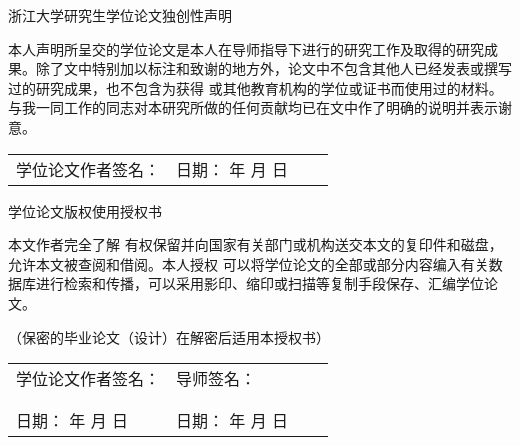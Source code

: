 {
  \vspace*{0.6em}%
  {
    \centering
    \xiaoer
    浙江大学研究生学位论文独创性声明 \par
  }

  \vspace{3.1em}
  {
    \setlength{\parindent}{2em}
    \linespread{1.6}
    \xiaosi
    本人声明所呈交的学位论文是本人在导师指导下进行的研究工作及取得的研究成果。除了文中特别加以标注和致谢的地方外，论文中不包含其他人已经发表或撰写过的研究成果，也不包含为获得 \underline{\kaiti\sihao\bfseries {}} 或其他教育机构的学位或证书而使用过的材料。与我一同工作的同志对本研究所做的任何贡献均已在文中作了明确的说明并表示谢意。 \par
  }

  \vspace{2.9em}
  {
    \xiaosi
    \begin{tabular}{@{} p{0.5\linewidth} p{0.5\linewidth} @{}}
    学位论文作者签名： & 日期： \hspace{4em} 年 \hspace{2em} 月 \hspace{2em} 日 \\
    \end{tabular} \par
  }

  \vspace{4.85em}
  {
    \centering
    \xiaoer
    学位论文版权使用授权书 \par
  }

  \vspace{2.2em}
  {
    \setlength{\parindent}{2em}
    \linespread{1.6}
    \xiaosi
    本文作者完全了解 \underline{\kaiti\sihao\bfseries {}} 有权保留并向国家有关部门或机构送交本文的复印件和磁盘，允许本文被查阅和借阅。本人授权 \underline{\kaiti\sihao\bfseries {}} 可以将学位论文的全部或部分内容编入有关数据库进行检索和传播，可以采用影印、缩印或扫描等复制手段保存、汇编学位论文。

    （保密的毕业论文（设计）在解密后适用本授权书） \par
  }

  \vspace{2.9em}

  {
    \xiaosi
    \begin{tabular}{@{} p{0.5\linewidth} p{0.5\linewidth} @{}}%
    学位论文作者签名： & 导师签名： \\
     & \\
     & \\
    日期： \hspace{4em} 年 \hspace{2em} 月 \hspace{2em} 日 & 日期： \hspace{4em} 年 \hspace{2em} 月 \hspace{2em} 日 \\
    \end{tabular} \par
  }
}
